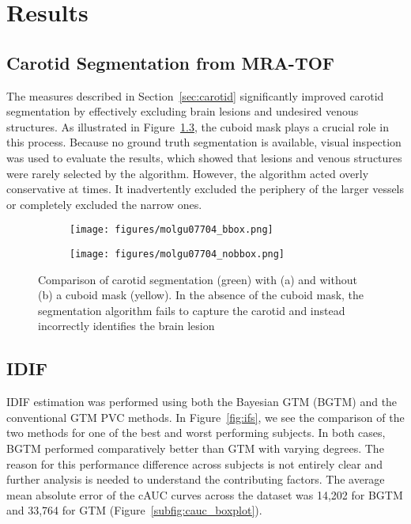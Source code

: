 \chapter{Results}
\section{Carotid Segmentation from MRA-TOF}
The measures described in Section~\ref{sec:carotid} significantly improved carotid segmentation by effectively excluding brain lesions and undesired venous structures.
As illustrated in Figure~\ref{fig:seg_compare}, the cuboid mask plays a crucial role in this process.
Because no ground truth segmentation is available, visual inspection was used to evaluate the results, which showed that lesions and venous structures were rarely selected by the algorithm.
However, the algorithm acted overly conservative at times. It inadvertently excluded the periphery of the larger vessels or completely excluded the narrow ones.
\begin{figure}[h]
	\centering
	\begin{subfigure}{0.45\textwidth}
		\texttt{[image: figures/molgu07704\_bbox.png]}
		\caption{}
		\label{subfig:seg_bbox}
	\end{subfigure}
	\begin{subfigure}{0.45\textwidth}
		\texttt{[image: figures/molgu07704\_nobbox.png]}
		\caption{}
		\label{subfig:seg_nobbox}
	\end{subfigure}
	\caption{Comparison of carotid segmentation (green) with (a) and without (b) a cuboid mask (yellow). In the absence of the cuboid mask, the segmentation algorithm fails to capture the carotid and instead incorrectly identifies the brain lesion}
	\label{fig:seg_compare}
\end{figure}
\section{IDIF}
IDIF estimation was performed using both the Bayesian GTM (BGTM) and the conventional GTM PVC methods.
In Figure~\ref{fig:ifs}, we see the comparison of the two methods for one of the best and worst performing subjects.
In both cases, BGTM performed comparatively better than GTM with varying degrees.
The reason for this performance difference across subjects is not entirely clear and further analysis is needed to understand the contributing factors.
The average mean absolute error of the cAUC curves across the dataset was 14,202 for BGTM and 33,764 for GTM (Figure~\ref{subfig:cauc_boxplot}).

